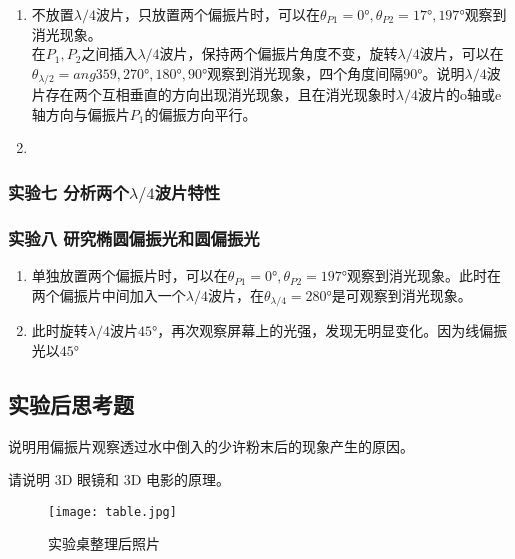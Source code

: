 \documentclass[dvipsnames, svgnames,a4paper,11pt]{article}
\begin{document}
	\begin{enumerate}
		\item 不放置$\lambda/4$波片，只放置两个偏振片时，可以在$\theta_{P1}=\ang{0},\theta_{P2}=\ang{17},\ang{197}$观察到消光现象。	\\
		
		在$P_1,P_2$之间插入$\lambda/4$波片，保持两个偏振片角度不变，旋转$\lambda/4$波片，可以在$\theta_{\lambda/2}=ang{359},\ang{270},\ang{180},\ang{90}$观察到消光现象，四个角度间隔$\ang{90}$。说明$\lambda/4$波片存在两个互相垂直的方向出现消光现象，且在消光现象时$\lambda/4$波片的o轴或e轴方向与偏振片$P_1$的偏振方向平行。

		\item 
	\end{enumerate}







	\subsubsection{实验七 \quad 分析两个$\lambda/4$波片特性}










	\subsubsection{实验八 \quad 研究椭圆偏振光和圆偏振光}

	\begin{enumerate}
		\item 单独放置两个偏振片时，可以在$\theta_{P1}=\ang{0},\theta_{P2}=\ang{197}$观察到消光现象。此时在两个偏振片中间加入一个$\lambda/4$波片，在$\theta_{\lambda/4}=\ang{280}$是可观察到消光现象。	\\
		\item 此时旋转$\lambda/4$波片$\ang{45}$，再次观察屏幕上的光强，发现无明显变化。因为线偏振光以$\ang{45}$
	\end{enumerate}

	









			
			
\subsection{实验后思考题}



\begin{question}
	说明用偏振片观察透过水中倒入的少许粉末后的现象产生的原因。
\end{question}
	


\begin{question}
	请说明 3D 眼镜和 3D 电影的原理。
\end{question}




\begin{figure}[H]
	\centering
	\texttt{[image: table.jpg]}
	\caption{实验桌整理后照片}
\end{figure}
	
\end{document}
